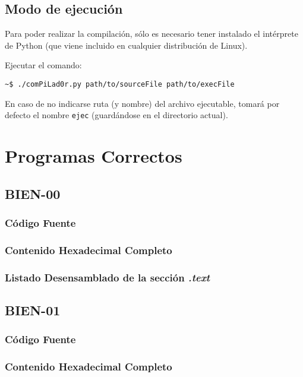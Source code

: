 \documentclass[a4paper,12pt]{article}
\begin{document}
\subsection{Modo de ejecución}
Para poder realizar la compilación, sólo es necesario tener instalado el intérprete de Python (que viene incluido en cualquier distribución de Linux). 

Ejecutar el comando:
\lstset{language=Bash}
\begin{lstlisting}
~$ ./comPiLad0r.py path/to/sourceFile path/to/execFile
\end{lstlisting}
En caso de no indicarse ruta (y nombre) del archivo ejecutable, tomará por defecto el nombre \texttt{ejec} (guardándose en el directorio actual).

\section{Programas Correctos}
\lstset{language=Pascal}

\subsection{BIEN-00}
\subsubsection{Código Fuente}

\subsubsection{Contenido Hexadecimal Completo}
\subsubsection{Listado Desensamblado de la sección \textit{.text}}

\subsection{BIEN-01}
\subsubsection{Código Fuente}

\subsubsection{Contenido Hexadecimal Completo}
\end{document}
